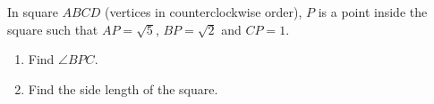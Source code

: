 In square $ABCD$ (vertices in counterclockwise order), $P$ is a point inside the square such that $AP=\sqrt5$, $BP=\sqrt2$ and $CP=1$.
\begin{enumerate}
\item[(a)] Find $\angle BPC$.
\item[(b)] Find the side length of the square.
\end{enumerate}
